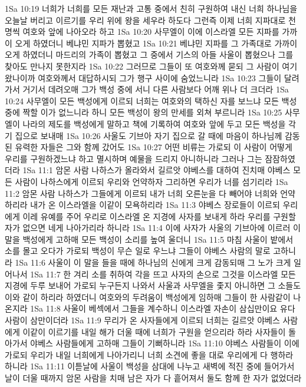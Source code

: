 1Sa 10:19  너희가 너희를 모든 재난과 고통 중에서 친히 구원하여 내신 너희 하나님을 오늘날 버리고 이르기를 우리 위에 왕을 세우라 하도다 그런즉 이제 너희 지파대로 천명씩 여호와 앞에 나아오라 하고
1Sa 10:20  사무엘이 이에 이스라엘 모든 지파를 가까이 오게 하였더니 베냐민 지파가 뽑혔고
1Sa 10:21  베냐민 지파를 그 가족대로 가까이 오게 하였더니 마드리의 가족이 뽑혔고 그 중에서 기스의 아들 사울이 뽑혔으나 그를 찾아도 만나지 못한지라
1Sa 10:22  그러므로 그들이 또 여호와께 묻되 그 사람이 여기 왔나이까 여호와께서 대답하시되 그가 행구 사이에 숨었느니라
1Sa 10:23  그들이 달려가서 거기서 데려오매 그가 백성 중에 서니 다른 사람보다 어깨 위나 더 크더라
1Sa 10:24  사무엘이 모든 백성에게 이르되 너희는 여호와의 택하신 자를 보느냐 모든 백성중에 짝할 이가 없느니라 하니 모든 백성이 왕의 만세를 외쳐 부르니라
1Sa 10:25  사무엘이 나라의 제도를 백성에게 말하고 책에 기록하여 여호와 앞에 두고 모든 백성을 각기 집으로 보내매
1Sa 10:26  사울도 기브아 자기 집으로 갈 때에 마음이 하나님께 감동된 유력한 자들은 그와 함께 갔어도
1Sa 10:27  어떤 비류는 가로되 이 사람이 어떻게 우리를 구원하겠느냐 하고 멸시하며 예물을 드리지 아니하니라 그러나 그는 잠잠하였더라
1Sa 11:1  암몬 사람 나하스가 올라와서 길르앗 야베스를 대하여 진치매 야베스 모든 사람이 나하스에게 이르되 우리와 언약하자 그리하면 우리가 너를 섬기리라
1Sa 11:2  암몬 사람 나하스가 그들에게 이르되 내가 너희 오른눈을 다 빼어야 너희와 언약하리라 내가 온 이스라엘을 이같이 모욕하리라
1Sa 11:3  야베스 장로들이 이르되 우리에게 이레 유예를 주어 우리로 이스라엘 온 지경에 사자를 보내게 하라 우리를 구원할 자가 없으면 네게 나아가리라 하니라
1Sa 11:4  이에 사자가 사울의 기브아에 이르러 이말을 백성에게 고하매 모든 백성이 소리를 높여 울더니
1Sa 11:5  마침 사울이 밭에서 소를 몰고 오다가 가로되 백성이 무슨 일로 우느냐 그들이 야베스 사람의 말로 고하니라
1Sa 11:6  사울이 이 말을 들을 때에 하나님의 신에게 크게 감동되매 그 노가 크게 일어나서
1Sa 11:7  한 겨리 소를 취하여 각을 뜨고 사자의 손으로 그것을 이스라엘 모든 지경에 두루 보내어 가로되 누구든지 나와서 사울과 사무엘을 좇지 아니하면 그 소들도 이와 같이 하리라 하였더니 여호와의 두려움이 백성에게 임하매 그들이 한 사람같이 나온지라
1Sa 11:8  사울이 베섹에서 그들을 계수하니 이스라엘 자손이 삼십만이요 유다 사람이 삼만이더라
1Sa 11:9  무리가 온 사자들에게 이르되 너희는 길르앗 야베스 사람에게 이같이 이르기를 내일 해가 더울 때에 너희가 구원을 얻으리라 하라 사자들이 돌아가서 야베스 사람들에게 고하매 그들이 기뻐하니라
1Sa 11:10  야베스 사람들이 이에 가로되 우리가 내일 너희에게 나아가리니 너희 소견에 좋을 대로 우리에게 다 행하라 하니라
1Sa 11:11  이튿날에 사울이 백성을 삼대에 나누고 새벽에 적진 중에 들어가서 날이 더울 때까지 암몬 사람을 치매 남은 자가 다 흩어져서 둘도 함께 한 자가 없었더라
